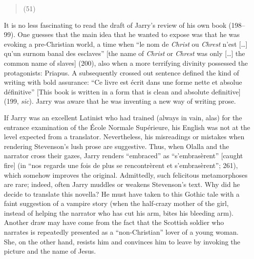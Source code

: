 \begin{review}
\begin{quote}
\begin{flushright}
(51)
\end{flushright}
\end{quote}

\noindent It is no less fascinating to read the draft of Jarry's review of his own
book (198--99). One guesses that the main idea that he wanted to expose
was that he was evoking a pre-Christian world, a time when ``le nom de \emph{Christ} ou \emph{Chrest} n’est [\ldots{}] qu’un surnom banal des esclaves'' [the name of \emph{Christ} or \emph{Chrest} was only [\dots{}] the common name of slaves] (200), also when a more
terrifying divinity possessed the protagonists: Priapus. A subsequently
crossed out sentence defined the kind of writing with bold assurance:
``Ce livre est écrit dans une forme nette et absolue définitive'' [This book is written in a form that is clean and absolute definitive] (199, \emph{sic}). Jarry was aware that he
was inventing a new way of writing prose.

If Jarry was an excellent Latinist who had trained (always in vain,
alas) for the entrance examination of the École Normale Supérieure, his
English was not at the level expected from a translator. Nevertheless,
his misreadings or mistakes when rendering Stevenson's lush prose are
suggestive. Thus, when Olalla and the narrator cross their gazes, Jarry
renders ``embraced'' as ``s'embrasèrent'' {[}caught fire{]} (in ``nos
regards une fois de plus se rencontrèrent et s'embrasèrent''; 261),
which somehow improves the original. Admittedly, such felicitous
metamorphoses are rare; indeed, often Jarry muddles or weakens
Stevenson's text. Why did he decide to translate this novella? He must
have taken to this Gothic tale with a faint suggestion of a vampire
story (when the half-crazy mother of the girl, instead of helping the
narrator who has cut his arm, bites his bleeding arm). Another draw may
have come from the fact that the Scottish soldier who narrates is
repeatedly presented as a ``non-Christian'' lover of a young woman. She,
on the other hand, resists him and convinces him to leave by invoking
the picture and the name of Jesus.


\end{review}
